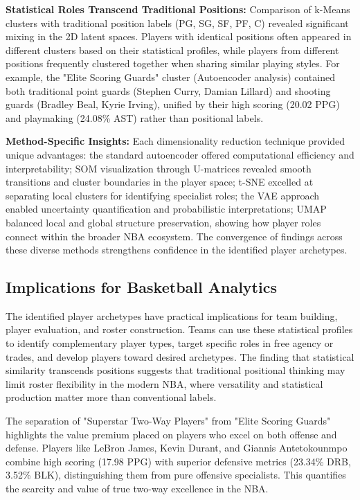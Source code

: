 \documentclass{article}
\begin{document}
\textbf{Statistical Roles Transcend Traditional Positions:} Comparison of k-Means clusters with traditional position labels (PG, SG, SF, PF, C) revealed significant mixing in the 2D latent spaces. Players with identical positions often appeared in different clusters based on their statistical profiles, while players from different positions frequently clustered together when sharing similar playing styles. For example, the "Elite Scoring Guards" cluster (Autoencoder analysis) contained both traditional point guards (Stephen Curry, Damian Lillard) and shooting guards (Bradley Beal, Kyrie Irving), unified by their high scoring (20.02 PPG) and playmaking (24.08\% AST) rather than positional labels.

\textbf{Method-Specific Insights:} Each dimensionality reduction technique provided unique advantages: the standard autoencoder offered computational efficiency and interpretability; SOM visualization through U-matrices revealed smooth transitions and cluster boundaries in the player space; t-SNE excelled at separating local clusters for identifying specialist roles; the VAE approach enabled uncertainty quantification and probabilistic interpretations; UMAP balanced local and global structure preservation, showing how player roles connect within the broader NBA ecosystem. The convergence of findings across these diverse methods strengthens confidence in the identified player archetypes.

\subsection{Implications for Basketball Analytics}

The identified player archetypes have practical implications for team building, player evaluation, and roster construction. Teams can use these statistical profiles to identify complementary player types, target specific roles in free agency or trades, and develop players toward desired archetypes. The finding that statistical similarity transcends positions suggests that traditional positional thinking may limit roster flexibility in the modern NBA, where versatility and statistical production matter more than conventional labels.

The separation of "Superstar Two-Way Players" from "Elite Scoring Guards" highlights the value premium placed on players who excel on both offense and defense. Players like LeBron James, Kevin Durant, and Giannis Antetokounmpo combine high scoring (17.98 PPG) with superior defensive metrics (23.34\% DRB, 3.52\% BLK), distinguishing them from pure offensive specialists. This quantifies the scarcity and value of true two-way excellence in the NBA.
\end{document}
